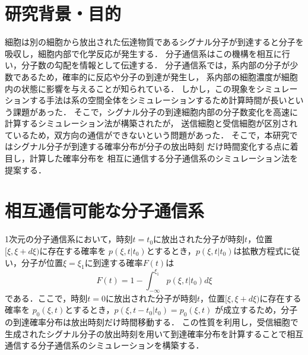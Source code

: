 \documentclass[twocolumn]{jarticle}
\begin{document}
\maketitle

\section{研究背景・目的}
細胞は別の細胞から放出された伝達物質であるシグナル分子が到達すると分子を吸収し，細胞内部で化学反応が発生する．
分子通信系はこの機構を相互に行い，分子数の勾配を情報として伝達する．
分子通信系では，系内部の分子が少数であるため，確率的に反応や分子の到達が発生し，
系内部の細胞濃度が細胞内の状態に影響を与えることが知られている\cite{Yamagishi}．
しかし，この現象をシミュレーションする手法は系の空間全体をシミュレーションするため計算時間が長いという課題があった．
そこで，シグナル分子の到達細胞内部の分子数変化を高速に計算するシミュレーション法\cite{hara}が構築されたが，
送信細胞と受信細胞が区別されているため，双方向の通信ができないという問題があった．
そこで，本研究ではシグナル分子が到達する確率分布が分子の放出時刻
だけ時間変化する点に着目し，計算した確率分布を
相互に通信する分子通信系のシミュレーション法を提案する．

\section{相互通信可能な分子通信系}
1次元の分子通信系において，時刻$t=t_0$に放出された分子が時刻$t$，位置$[\xi,\xi+d\xi)$に存在する確率を
$p(\xi,t|t_0)$とするとき，$p(\xi,t|t_0)$は拡散方程式に従い，分子が位置$\xi =\xi_1$に到達する確率$F(t)$は
\begin{equation}
    F(t) = 1- \int_{-\infty}^{\xi_1} p(\xi,t|t_0)d\xi
\end{equation}
である．ここで，時刻$t=0$に放出された分子が時刻$t$，位置$[\xi,\xi+d\xi)$に存在する確率を
$p_0(\xi,t)$とするとき，$p(\xi,t-t_0|t_0)=$$p_0(\xi,t)$
が成立するため，分子の到達確率分布は放出時刻だけ時間移動する．
この性質を利用し，受信細胞で生成されたシグナル分子の放出時刻を用いて到達確率分布を計算することで相互通信する分子通信系のシミュレーションを構築する．
\end{document}
